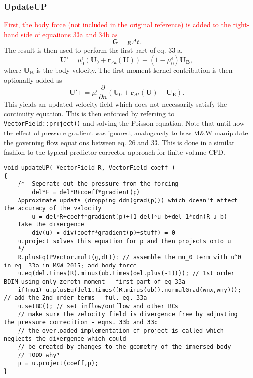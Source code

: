 \documentclass[notitlepage]{article}
\begin{document}
\subsubsection{UpdateUP}

\textcolor{red}{First, the body force (not included in the original reference) is added to the
right-hand side of equations 33a and 34b as}
%
\begin{equation}\label{eq:BDIM_bodyForce}
\mathbf{G} = \mathbf{g} \Delta t .
\end{equation}
%
The result is then used to perform the first part of eq. 33 a,
%
\begin{equation}\label{eq:BDIM_1stOrder_step1a}
\mathbf{U'} = \mu_0^\epsilon \left(\mathbf{U}_0 + \mathbf{r}_{\Delta t}(\mathbf{U}) \right)
	- (1-\mu_0^\epsilon) \mathbf{U_B} ,
\end{equation}
%
where $\mathbf{U_B}$ is the body velocity. The first moment kernel contribution
is then optionally added as
%
\begin{equation}\label{eq:BDIM_1stOrder_step1b}
\mathbf{U'} += \mu_1^\epsilon \frac{\partial}{\partial n} \left( \mathbf{U}_0 + \mathbf{r}_{\Delta t}(\mathbf{U}) - \mathbf{U_B} \right) .
\end{equation}
%
This yields an updated velocity field which does not necessarily satisfy the continuity
equation. This is then enforced by referring to \texttt{VectorField::project()} and
solving the Poisson equation.
Note that until now the effect of pressure gradient was ignored, analogously to how
M\&W manipulate the governing flow equations between eq. 26 and 33. This is done in
a similar fashion to the typical predictor-corrector approach for finite volume CFD.

\begin{lstlisting}[style=myCpp]
void updateUP( VectorField R, VectorField coeff )
{
	/*  Seperate out the pressure from the forcing
		del*F = del*R+coeff*gradient(p)
	Approximate update (dropping ddn(grad(p))) which doesn't affect the accuracy of the velocity
		u = del*R+coeff*gradient(p)+[1-del]*u_b+del_1*ddn(R-u_b)
	Take the divergence
		div(u) = div(coeff*gradient(p)+stuff) = 0
	u.project solves this equation for p and then projects onto u
	*/
	R.plusEq(PVector.mult(g,dt)); // assemble the mu_0 term with u^0 in eq. 33a in M&W 2015; add body force
	u.eq(del.times(R).minus(ub.times(del.plus(-1)))); // 1st order BDIM using only zeroth moment - first part of eq 33a
	if(mu1) u.plusEq(del1.times((R.minus(ub)).normalGrad(wnx,wny))); // add the 2nd order terms - full eq. 33a
	u.setBC(); // set inflow/outflow and other BCs
	// make sure the velocity field is divergence free by adjusting the pressure correcition - eqns. 33b and 33c
	// the overloaded implementation of project is called which neglects the divergence which could
	// be created by changes to the geometry of the immersed body
	// TODO why?
	p = u.project(coeff,p);
}
\end{lstlisting}
\end{document}
